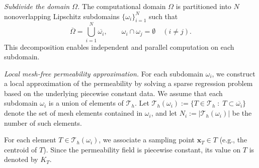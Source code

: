 \documentclass[final,1p,times]{elsarticle}
\theoremstyle{plain}
\theoremstyle{definition}
\theoremstyle{remark}
\newcommand{\Step}[2]{\item[Step #1.] #2}
\newcommand{\bx}{\mathbf{x}}
\begin{document}
\begin{computesteps}
\Step{1}{\textit{Subdivide the domain $\Omega$.} The computational domain $\Omega$ is partitioned into $N$ nonoverlapping Lipschitz subdomains $\{\omega_i\}_{i=1}^N$ such that
$$
\overline{\Omega} = \bigcup_{i=1}^N \overline{\omega_i},
\qquad
\omega_i \cap \omega_j = \emptyset \quad (i\neq j).
$$
This decomposition enables independent and parallel computation on each subdomain.}
    
\Step{2}{\textit{Local mesh-free permeability approximation.}
For each subdomain $\omega_i$, we construct a local approximation of the permeability by solving a sparse regression problem based on the underlying piecewise constant data. We assume that each subdomain $\omega_i$ is a union of elements of $\mathcal{T}_h$. Let
$\mathcal{T}_h(\omega_i) := \{ T \in \mathcal{T}_h \;:\; T \subset \overline{\omega_i} \}$
denote the set of mesh elements contained in $\omega_i$, and let $N_i := |\mathcal{T}_h(\omega_i)|$ be the number of such elements.

For each element $T \in \mathcal{T}_h(\omega_i)$, we associate a sampling point $\bx_T \in T$ (e.g., the centroid of $T$). Since the permeability field is piecewise constant, its value on $T$ is denoted by $K_T$.


}
\end{computesteps}
\end{document}
